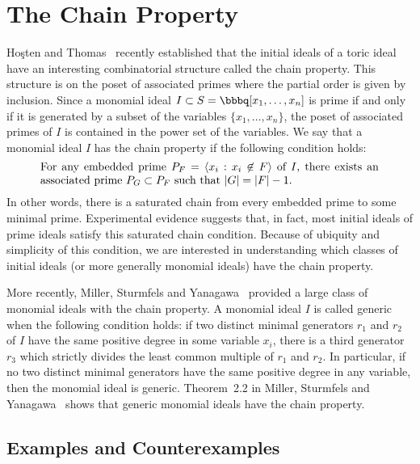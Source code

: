 \section{The Chain Property}


Ho\c{s}ten and Thomas~\cite{MR2000b:13037} recently established that
the initial ideals of a toric ideal have an interesting combinatorial
structure called the chain property.  This structure is on the poset
of associated primes where the partial order is given by inclusion.
Since a monomial ideal $I \subset S = \bbbq[x_{1}, \dotsc, x_{n}]$ is
prime if and only if it is generated by a subset of the variables $\{
x_{1}, \dotsc, x_{n}\}$, the poset of associated primes of $I$ is
contained in the power set of the variables.  We say that a monomial
ideal $I$ has the chain property if the
following condition holds:
\[
\text{\begin{minipage}[t]{300pt}
For any embedded prime $P_{F} = \langle x_{i} : x_{i} \not\in F
\rangle$ of $I$, there exists an associated prime $P_{G} \subset
P_{F}$ such that $|G| = |F|-1$.
\end{minipage}}
\]
In other words, there is a saturated chain from every embedded prime
to some minimal prime.  
Experimental evidence suggests that, in fact, most initial ideals 
of prime ideals satisfy this saturated chain condition.
Because
of ubiquity and simplicity of this condition, we are interested in
understanding which classes of initial ideals (or more generally
monomial ideals) have the chain property.  

More recently, Miller, Sturmfels and Yanagawa~\cite{MR1769661}
provided a large class of monomial ideals with the chain property.  A
monomial ideal $I$ is called generic
when the following condition holds: if two distinct minimal generators
$r_{1}$ and $r_{2}$ of $I$ have the same positive degree in some
variable $x_{i}$, there is a third generator $r_{3}$ which strictly
divides the least common multiple of $r_{1}$ and $r_{2}$.  In
particular, if no two distinct minimal generators have the same
positive degree in any variable, then the monomial ideal is generic.
Theorem~2.2 in Miller, Sturmfels and Yanagawa~\cite{MR1769661} shows
that generic monomial ideals have the chain property.


\subsection*{Examples and Counterexamples}



